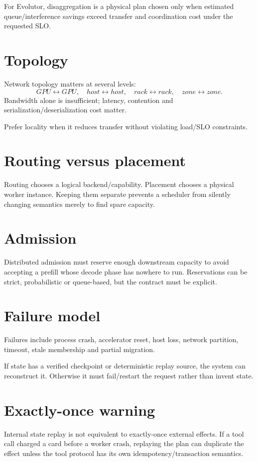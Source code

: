 For Evolutor, disaggregation is a physical plan chosen only when estimated queue/interference savings exceed transfer and coordination cost under the requested SLO.

\section{Topology}
Network topology matters at several levels:
\[
GPU\leftrightarrow GPU,\quad host\leftrightarrow host,\quad rack\leftrightarrow rack,\quad zone\leftrightarrow zone.
\]
Bandwidth alone is insufficient; latency, contention and serialization/deserialization cost matter.

Prefer locality when it reduces transfer without violating load/SLO constraints.

\section{Routing versus placement}
Routing chooses a logical backend/capability. Placement chooses a physical worker instance. Keeping them separate prevents a scheduler from silently changing semantics merely to find spare capacity.

\section{Admission}
Distributed admission must reserve enough downstream capacity to avoid accepting a prefill whose decode phase has nowhere to run. Reservations can be strict, probabilistic or queue-based, but the contract must be explicit.

\section{Failure model}
Failures include process crash, accelerator reset, host loss, network partition, timeout, stale membership and partial migration.


If state has a verified checkpoint or deterministic replay source, the system can reconstruct it. Otherwise it must fail/restart the request rather than invent state.

\section{Exactly-once warning}
Internal state replay is not equivalent to exactly-once external effects. If a tool call charged a card before a worker crash, replaying the plan can duplicate the effect unless the tool protocol has its own idempotency/transaction semantics.

